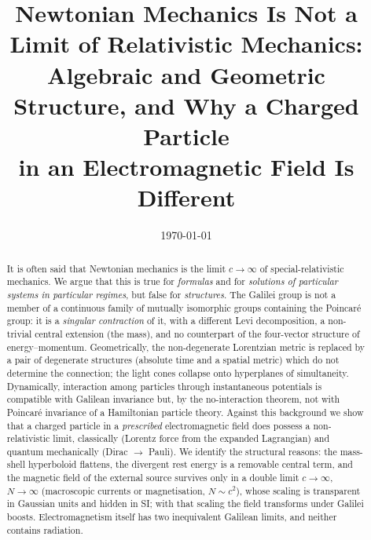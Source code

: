 \documentclass[11pt,a4paper]{article}
\title{Newtonian Mechanics Is Not a Limit of Relativistic Mechanics:\\[2pt]
Algebraic and Geometric Structure, and Why a Charged Particle\\
in an Electromagnetic Field Is Different}
\author{}   %
\date{\today}
\theoremstyle{plain}
\theoremstyle{definition}
\theoremstyle{remark}
\begin{document}
\maketitle

\begin{abstract}
\noindent
It is often said that Newtonian mechanics is the limit $c\to\infty$ of special-relativistic
mechanics. We argue that this is true for \emph{formulas} and for \emph{solutions of particular
systems in particular regimes}, but false for \emph{structures}. The Galilei group is not a
member of a continuous family of mutually isomorphic groups containing the Poincar\'e group: it
is a \emph{singular contraction} of it, with a different Levi decomposition, a non-trivial central
extension (the mass), and no counterpart of the four-vector structure of energy--momentum.
Geometrically, the non-degenerate Lorentzian metric is replaced by a pair of degenerate
structures (absolute time and a spatial metric) which do not determine the connection;
the light cones collapse onto hyperplanes of simultaneity. Dynamically, interaction among
particles through instantaneous potentials is compatible with Galilean invariance but,
by the no-interaction theorem, not with Poincar\'e invariance of a Hamiltonian particle theory.
Against this background we show that a charged particle in a \emph{prescribed} electromagnetic
field does possess a non-relativistic limit, classically (Lorentz force from the expanded
Lagrangian) and quantum mechanically (Dirac $\to$ Pauli). We identify the structural reasons:
the mass-shell hyperboloid flattens, the divergent rest energy is a removable central term,
and the magnetic field of the external source survives only in a double limit $c\to\infty$,
$N\to\infty$ (macroscopic currents or magnetisation, $N\sim c^2$), whose scaling is transparent in
Gaussian units and hidden in SI; with that scaling the field transforms under Galilei boosts.
Electromagnetism itself has two inequivalent Galilean limits, and neither contains radiation.
\end{abstract}

\end{document}

